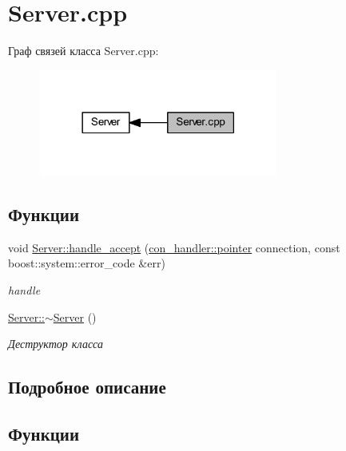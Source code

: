 \hypertarget{group__servercpp}{}\section{Server.\+cpp}
\label{group__servercpp}
Граф связей класса Server.\+cpp\+:\nopagebreak
\begin{figure}[H]
\begin{center}
\leavevmode
\includegraphics[width=222pt]{group__servercpp}
\end{center}
\end{figure}
\subsection*{Функции}
\begin{DoxyCompactItemize}
\item 
void \mbox{\hyperlink{group__servercpp_gadb53e5d1b7c0ad8a79ce236c8ca5d50c}{Server\+::handle\+\_\+accept}} (\mbox{\hyperlink{classcon__handler_ada4a1b970f9fd8e55460a58cf7f7ce2c}{con\+\_\+handler\+::pointer}} connection, const boost\+::system\+::error\+\_\+code \&err)
\begin{DoxyCompactList}\small\item\em handle \end{DoxyCompactList}\item 
\mbox{\hyperlink{group__servercpp_ga4b3aa2579cb1c8cd1d069582c14d0fa6}{Server\+::$\sim$\+Server}} ()
\begin{DoxyCompactList}\small\item\em Деструктор класса \end{DoxyCompactList}\end{DoxyCompactItemize}


\subsection{Подробное описание}


\subsection{Функции}
\mbox{\label{group__servercpp_gadb53e5d1b7c0ad8a79ce236c8ca5d50c}} 
